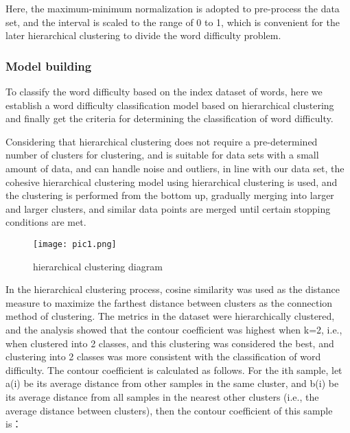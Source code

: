 \documentclass[12pt]{article}  %
\begin{document}
Here, the maximum-minimum normalization is adopted to pre-process the data set, and the interval is scaled to the range of 0 to 1, which is convenient for the later hierarchical clustering to divide the word difficulty problem.

\subsubsection{Model building}

To classify the word difficulty based on the index dataset of words, here we establish a word difficulty classification model based on hierarchical clustering and finally get the criteria for determining the classification of word difficulty.

Considering that hierarchical clustering does not require a pre-determined number of clusters for clustering, and is suitable for data sets with a small amount of data, and can handle noise and outliers, in line with our data set, the cohesive hierarchical clustering model using hierarchical clustering is used, and the clustering is performed from the bottom up, gradually merging into larger and larger clusters, and similar data points are merged until certain stopping conditions are met.

\begin{figure}[H]
	\centering
	\texttt{[image: pic1.png]}
	\caption{hierarchical clustering diagram}
	\label{img13}
\end{figure}

In the hierarchical clustering process, cosine similarity was used as the distance measure to maximize the farthest distance between clusters as the connection method of clustering. The metrics in the dataset were hierarchically clustered, and the analysis showed that the contour coefficient was highest when k=2, i.e., when clustered into 2 classes, and this clustering was considered the best, and clustering into 2 classes was more consistent with the classification of word difficulty.
The contour coefficient is calculated as follows.
For the ith sample, let a(i) be its average distance from other samples in the same cluster, and b(i) be its average distance from all samples in the nearest other clusters (i.e., the average distance between clusters), then the contour coefficient of this sample is：
\end{document}
